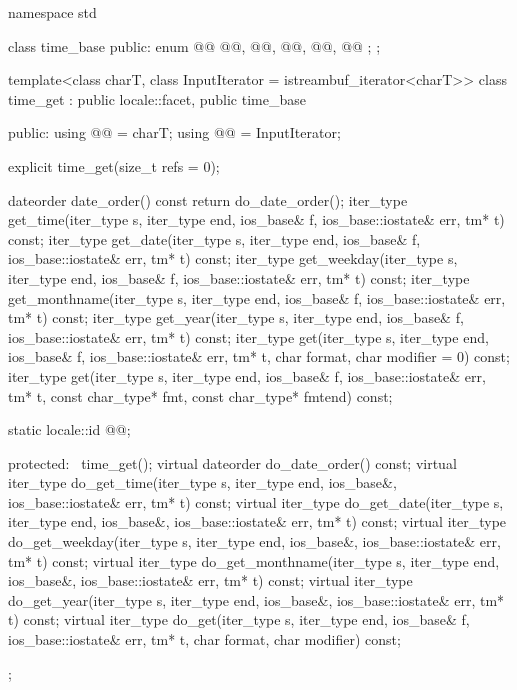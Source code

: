 %
%
\begin{codeblock}
namespace std {
  class time_base {
  public:
    enum @@ { @@, @@, @@, @@, @@ };
  };

  template<class charT, class InputIterator = istreambuf_iterator<charT>>
  class time_get : public locale::facet, public time_base {
  public:
    using @@ = charT;
    using @@ = InputIterator;

    explicit time_get(size_t refs = 0);

    dateorder date_order() const { return do_date_order(); }
    iter_type get_time(iter_type s, iter_type end, ios_base& f,
                       ios_base::iostate& err, tm* t) const;
    iter_type get_date(iter_type s, iter_type end, ios_base& f,
                       ios_base::iostate& err, tm* t) const;
    iter_type get_weekday(iter_type s, iter_type end, ios_base& f,
                          ios_base::iostate& err, tm* t) const;
    iter_type get_monthname(iter_type s, iter_type end, ios_base& f,
                            ios_base::iostate& err, tm* t) const;
    iter_type get_year(iter_type s, iter_type end, ios_base& f,
                       ios_base::iostate& err, tm* t) const;
    iter_type get(iter_type s, iter_type end, ios_base& f,
                  ios_base::iostate& err, tm* t, char format, char modifier = 0) const;
    iter_type get(iter_type s, iter_type end, ios_base& f,
                  ios_base::iostate& err, tm* t, const char_type* fmt,
                  const char_type* fmtend) const;

    static locale::id @@;

  protected:
    ~time_get();
    virtual dateorder do_date_order() const;
    virtual iter_type do_get_time(iter_type s, iter_type end, ios_base&,
                                  ios_base::iostate& err, tm* t) const;
    virtual iter_type do_get_date(iter_type s, iter_type end, ios_base&,
                                  ios_base::iostate& err, tm* t) const;
    virtual iter_type do_get_weekday(iter_type s, iter_type end, ios_base&,
                                     ios_base::iostate& err, tm* t) const;
    virtual iter_type do_get_monthname(iter_type s, iter_type end, ios_base&,
                                       ios_base::iostate& err, tm* t) const;
    virtual iter_type do_get_year(iter_type s, iter_type end, ios_base&,
                                  ios_base::iostate& err, tm* t) const;
    virtual iter_type do_get(iter_type s, iter_type end, ios_base& f,
                             ios_base::iostate& err, tm* t, char format, char modifier) const;
  };
}
\end{codeblock}

